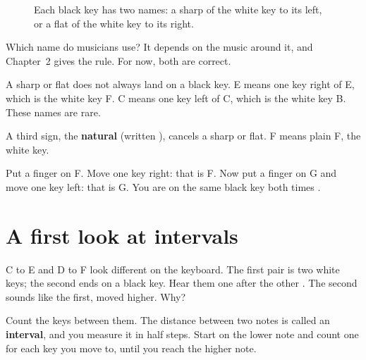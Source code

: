 \begin{figure}[htbp]
\centering
{}
\caption{Each black key has two names: a sharp of the white key to its left, or a flat of the white key to its right.}
\label{fig:two-names}
\end{figure}

Which name do musicians use? It depends on the music around it, and Chapter~2 gives the rule. For now, both are correct.

A sharp or flat does not always land on a black key. E\sh{} means one key right of E, which is the white key F. C\fl{} means one key left of C, which is the white key B. These names are rare.

A third sign, the \textbf{natural} (written \nat), cancels a sharp or flat. F\nat{} means plain F, the white key.

\begin{tryitbox}
Put a finger on F. Move one key right: that is F\sh. Now put a finger on G and move one key left: that is G\fl. You are on the same black key both times .
\end{tryitbox}

\section{A first look at intervals}

C to E and D to F\sh{} look different on the keyboard. The first pair is two white keys; the second ends on a black key. Hear them one after the other . The second sounds like the first, moved higher. Why?

Count the keys between them. The distance between two notes is called an \textbf{interval}, and you measure it in half steps. Start on the lower note and count one for each key you move to, until you reach the higher note.

